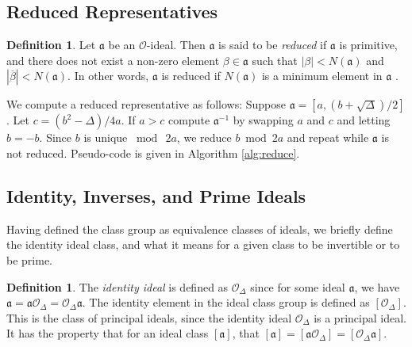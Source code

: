 \documentclass{ucalgthes1}
\theoremstyle{plain}
\theoremstyle{definition}
\newtheorem{defn}[thm]{Definition}
\newcommand{\OO}{\mathcal{O}}
\begin{document}
\subsection{Reduced Representatives}
\label{subsec:reduction}
\begin{defn}
Let $\mathfrak{a}$ be an $\OO$-ideal. Then $\mathfrak{a}$ is said to be \emph{reduced} if $\mathfrak{a}$ is primitive, and there does not exist a non-zero element $\beta \in \mathfrak{a}$ such that $|\beta| < N(\mathfrak{a})$ and $|\overline{\beta}| < N(\mathfrak{a})$.  In other words, $\mathfrak a$ is reduced if $N(\mathfrak{a})$ is a minimum element in $\mathfrak{a}$ \cite[p.~98]{Jac09}.
\end{defn}

We compute a reduced representative as follows:  Suppose $\mathfrak a = [a, (b + \sqrt\Delta)/2]$.  Let $c = (b^2 - \Delta)/4a$.  If $a > c$ compute ${\mathfrak a}^{-1}$ by swapping $a$ and $c$ and letting $b = -b$.  Since $b$ is unique $\bmod{~2a}$, we reduce $b \bmod{2a}$ and repeat while $\mathfrak a$ is not reduced.  Pseudo-code is given in Algorithm \ref{alg:reduce}.



\subsection{Identity, Inverses, and Prime Ideals}\label{subsec:iipIdeals}

Having defined the class group as equivalence classes of ideals, we briefly define the identity ideal class, and what it means for a given class to be invertible or to be prime.

\begin{defn}
The \emph{identity ideal} is defined as $\OO_\Delta$ since for some ideal $\mathfrak a$, we have $\mathfrak a = \mathfrak a \OO_\Delta = \OO_\Delta \mathfrak a$.  The identity element in the ideal class group is defined as $[\OO_\Delta]$.  This is the class of principal ideals, since the identity ideal $\OO_\Delta$ is a principal ideal.  It has the property that for an ideal class $[\mathfrak a]$, that $[\mathfrak a] = [\mathfrak a \OO_\Delta] = [\OO_\Delta \mathfrak a]$. 
\end{defn}
\end{document}
